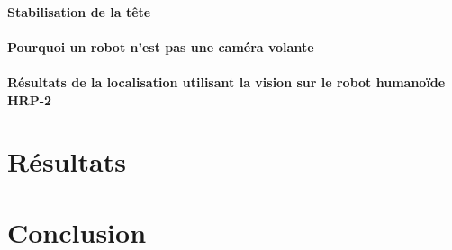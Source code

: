 \paragraph{Stabilisation de la tête}
\paragraph{Pourquoi un robot n'est pas une caméra volante}
\paragraph{Résultats de la localisation utilisant la vision sur le robot humanoïde HRP-2}

\section{Résultats}

\section{Conclusion}
